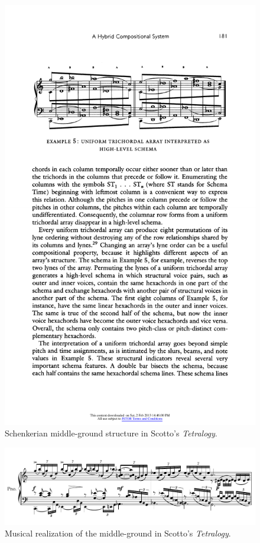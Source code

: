 \begin{example}
	\begin{figure}[htbp]
    	\centering
		\includegraphics[width=6.5in]{figures/scotto-schenker1.pdf}
		\caption[Schenkerian middle-ground structure in Scotto's \emph{Tetralogy}]{Schenkerian middle-ground structure in Scotto's \emph{Tetralogy}.}
    	\label{fig:scotto-schenker1}
	\end{figure}
	
	\begin{figure}[htbp]
    	\centering
    	\includegraphics[width=6.5in]{figures/Scotto_1.pdf} %
		\caption[Musical realization of the middle-ground in Scotto's \emph{Tetralogy}]{Musical realization of the middle-ground in Scotto's \emph{Tetralogy}.}
    	\label{fig:scotto-music1}
	\end{figure}
	

\end{example}
